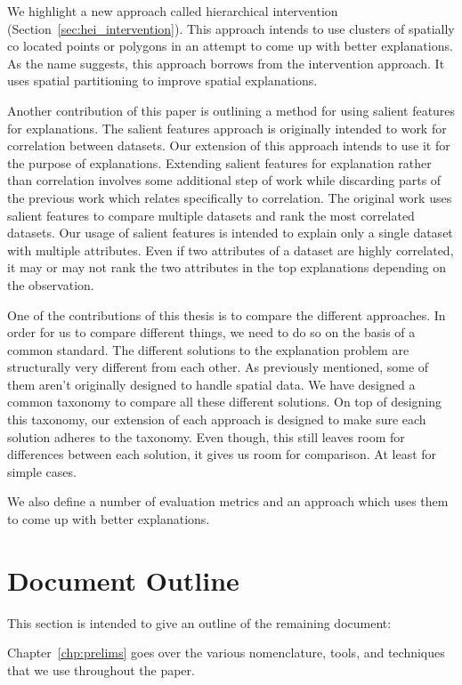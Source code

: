 We highlight a new approach called hierarchical intervention (Section~\ref{sec:hei_intervention}). This approach intends to use clusters of spatially co located points or polygons in an attempt to come up with better explanations. As the name suggests, this approach borrows from the intervention approach. It uses spatial partitioning to improve spatial explanations.

Another contribution of this paper is outlining a method for using salient features for explanations. The salient features approach is originally intended to work for correlation between datasets. Our extension of this approach intends to use it for the purpose of explanations. Extending salient features for explanation rather than correlation involves some additional step of work while discarding parts of the previous work which relates specifically to correlation. The original work uses salient features to compare multiple datasets and rank the most correlated datasets. Our usage of salient features is intended to explain only a single dataset with multiple attributes. Even if two attributes of a dataset are highly correlated, it may or may not rank the two attributes in the top explanations depending on the observation.

One of the contributions of this thesis is to compare the different approaches. In order for us to compare different things, we need to do so on the basis of a common standard. The different solutions to the explanation problem are structurally very different from each other. As previously mentioned, some of them aren't originally designed to handle spatial data. We have designed a common taxonomy to compare all these different solutions. On top of designing this taxonomy, our extension of each approach is designed to make sure each solution adheres to the taxonomy. Even though, this still leaves room for differences between each solution, it gives us room for comparison. At least for simple cases.

We also define a number of evaluation metrics and an approach which uses them to come up with better explanations.

\section{Document Outline}

This section is intended to  give an outline of the remaining document:


Chapter~\ref{chp:prelims} goes over the various nomenclature, tools, and techniques that we use throughout the paper.

